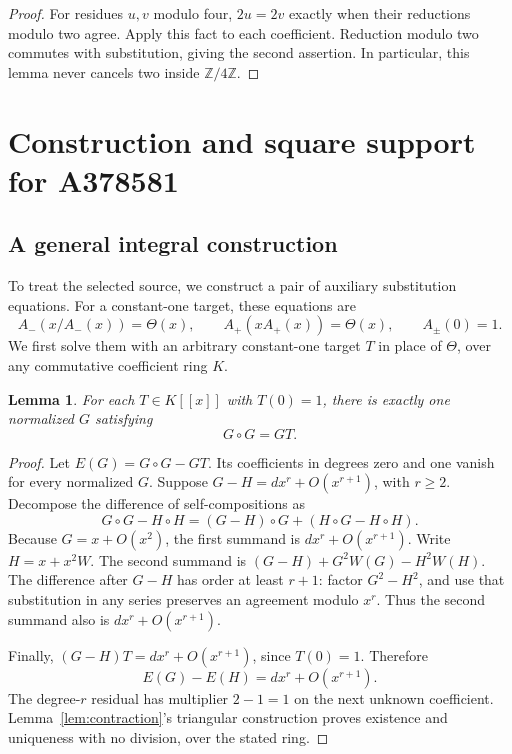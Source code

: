 \documentclass[11pt,a4paper]{article}
\newtheorem{lemma}[theorem]{Lemma}
\theoremstyle{remark}
\newcommand{\Z}{\mathbb Z}
\newcommand{\ps}[1]{#1[[x]]}
\begin{document}
\begin{proof}
For residues $u,v$ modulo four, $2u=2v$ exactly when their reductions modulo
two agree. Apply this fact to each coefficient. Reduction modulo two
commutes with substitution, giving the second assertion. In particular,
this lemma never cancels two inside $\Z/4\Z$.
\end{proof}

\section{Construction and square support for A378581}

\subsection{A general integral construction}

To treat the selected source, we construct a pair of auxiliary substitution
equations. For a constant-one target, these equations are
\begin{equation}\label{eq:thetaoriginal}
 A_-(x/A_-(x))=\Theta(x),\qquad
 A_+(xA_+(x))=\Theta(x),\qquad A_\pm(0)=1.
\end{equation}
We first solve them with an arbitrary constant-one target $T$ in place
of $\Theta$, over any commutative coefficient ring $K$.

\begin{lemma}\label{lem:normalroot}
For each $T\in\ps K$ with $T(0)=1$, there is exactly one normalized $G$
satisfying
\begin{equation}\label{eq:normalroot}
 G\circ G=GT.
\end{equation}
\end{lemma}

\begin{proof}
Let $E(G)=G\circ G-GT$. Its coefficients in degrees zero and one vanish
for every normalized $G$. Suppose $G-H=d x^r+O(x^{r+1})$, with $r\ge2$.
Decompose the difference of self-compositions as
\[
 G\circ G-H\circ H=(G-H)\circ G+(H\circ G-H\circ H).
\]
Because $G=x+O(x^2)$, the first summand is
$d x^r+O(x^{r+1})$. Write $H=x+x^2W$. The second summand is
$(G-H)+G^2W(G)-H^2W(H)$. The difference after $G-H$ has order at least
$r+1$: factor $G^2-H^2$, and use that substitution in any series
preserves an agreement modulo $x^r$. Thus the second summand also is
$d x^r+O(x^{r+1})$.

Finally, $(G-H)T=d x^r+O(x^{r+1})$, since $T(0)=1$. Therefore
\[
 E(G)-E(H)=d x^r+O(x^{r+1}).
\]
The degree-$r$ residual has multiplier $2-1=1$ on the next unknown
coefficient. Lemma~\ref{lem:contraction}'s triangular construction proves
existence and uniqueness with no division, over the stated ring.
\end{proof}
\end{document}
